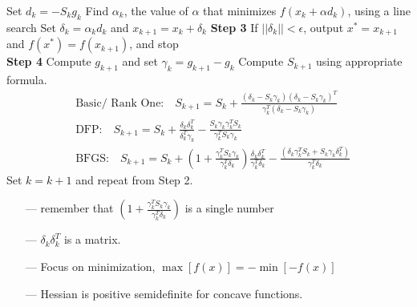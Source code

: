 \begin{multicols}{3}
Set $d_k=-S_kg_k$ \newline
Find $\alpha_k$, the value of $\alpha$ that minimizes $f(x_k+\alpha d_k)$, using a line search \newline
Set $\delta_k=\alpha_k d_k$ and $x_{k+1}=x_k+\delta_k$ \newline
\textbf{Step 3} \newline
If $||\delta_k|| < \epsilon$, output $x^* = x_{k+1}$ and $f(x^*) = f(x_{k+1})$, and stop \\
\textbf{Step 4} \newline
Compute $g_{k+1}$ and set $\gamma_k=g_{k+1}-g_k$ \newline
Compute $S_{k+1}$ using appropriate formula.
\begin{align*}
&\text{Basic/ Rank One:} \quad S_{k+1}=S_k+\frac{(\delta_k-S_k \gamma_k)(\delta_k-S_k \gamma_k)^T}{\gamma_k^T(\delta_k-S_k\gamma_k)}\\
&\text{DFP:}\quad S_{k+1}=S_k+\frac{\delta_k \delta_k^T}{\delta_k^T \gamma_k}-\frac{S_k\gamma_k\gamma_k^TS_k}{\gamma_k^TS_k\gamma_k}\\
&\text{BFGS:} \quad S_{k+1}=S_k+\left(1+\frac{\gamma_k^TS_k\gamma_k}{\gamma_k^T\delta_k}\right)\frac{\delta_k\delta_k^T}{\gamma_k^T\delta_k}-\frac{(\delta_k\gamma_k^TS_k+S_k\gamma_k\delta_k^T)}{\gamma_k^T\delta_k}
\end{align*}
Set $k=k+1$ and repeat from Step 2. \newline
\begin{itemize}
	\item[---] remember that $\left(1+\frac{\gamma_k^TS_k\gamma_k}{\gamma_k^T\delta_k}\right)$ is a single number
	\item[---] $\delta_k\delta_k^T$ is a matrix.
	\item[---] Focus on minimization, $\max[f(x)] =-\min[-f(x)]$
	\item[---] Hessian is positive semidefinite for concave functions.
\end{itemize}
\end{multicols}